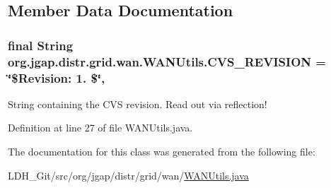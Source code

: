 \subsection{Member Data Documentation}
\hypertarget{classorg_1_1jgap_1_1distr_1_1grid_1_1wan_1_1_w_a_n_utils_ab6d1bd92b58d942faea84dc3be2996f0}{
\subsubsection[{C\-V\-S\-\_\-\-R\-E\-V\-I\-S\-I\-O\-N}]{\setlength{\rightskip}{0pt plus 5cm}final String org.\-jgap.\-distr.\-grid.\-wan.\-W\-A\-N\-Utils.\-C\-V\-S\-\_\-\-R\-E\-V\-I\-S\-I\-O\-N = \char`\"{}\$Revision\-: 1. \$\char`\"{}\hspace{0.3cm}{\ttfamily [static]}, {\ttfamily [private]}}}\label{classorg_1_1jgap_1_1distr_1_1grid_1_1wan_1_1_w_a_n_utils_ab6d1bd92b58d942faea84dc3be2996f0}
String containing the C\-V\-S revision. Read out via reflection! 

Definition at line 27 of file W\-A\-N\-Utils.\-java.



The documentation for this class was generated from the following file\-:\begin{DoxyCompactItemize}
\item 
L\-D\-H\-\_\-\-Git/src/org/jgap/distr/grid/wan/\hyperlink{_w_a_n_utils_8java}{W\-A\-N\-Utils.\-java}\end{DoxyCompactItemize}

